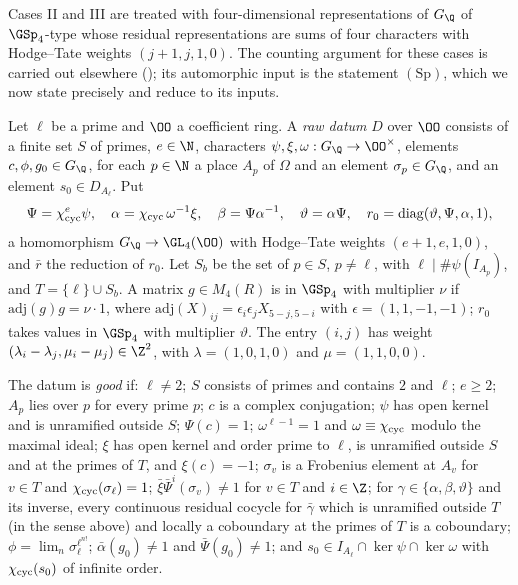 Cases II and III are treated with four-dimensional representations of $G_\Q$ of $\GSp_4$-type whose residual representations are
sums of four characters with Hodge--Tate weights $(j+1,j,1,0)$. The counting argument for these cases is carried out elsewhere
(); its automorphic input is the
statement $(\mathrm{Sp})$, which we now state precisely and reduce to its inputs.

\begin{definition}\label{pf:eis:raw}
Let $\ell$ be a prime and $\OO$ a coefficient ring. A \emph{raw datum} $D$ over $\OO$ consists of a finite set $S$ of primes, $e\in\N$,
characters $\psi,\xi,\omega:G_\Q\to\OO^\times$, elements $c,\phi,g_0\in G_\Q$, for each $p\in\N$ a place $A_p$ of $\Omega$ and an element
$\sigma_p\in G_\Q$, and an element $s_0\in D_{A_\ell}$. Put
\[
 \Psi=\chi_{\mathrm{cyc}}^e\psi,\quad\alpha=\chi_{\mathrm{cyc}}\,\omega^{-1}\xi,\quad\beta=\Psi\alpha^{-1},\quad\vartheta=\alpha\Psi,\quad
 r_0=\mathrm{diag}(\vartheta,\Psi,\alpha,1),
\]
a homomorphism $G_\Q\to\GL_4(\OO)$ with Hodge--Tate weights $(e+1,e,1,0)$, and $\bar r$ the reduction of $r_0$. Let $S_b$ be the set of $p\in S$, $p\ne\ell$, with
$\ell\mid\#\psi(I_{A_p})$, and $T=\{\ell\}\cup S_b$. A matrix $g\in M_4(R)$ is in $\GSp_4$ with multiplier $\nu$ if
$\mathrm{adj}(g)g=\nu\cdot1$, where $\mathrm{adj}(X)_{ij}=\epsilon_i\epsilon_jX_{5-j,5-i}$ with $\epsilon=(1,1,-1,-1)$; $r_0$ takes values in $\GSp_4$ with
multiplier $\vartheta$. The entry $(i,j)$ has weight $(\lambda_i-\lambda_j,\mu_i-\mu_j)\in\Z^2$, with $\lambda=(1,0,1,0)$ and $\mu=(1,1,0,0)$.

The datum is \emph{good} if: $\ell\ne2$; $S$ consists of primes and contains $2$ and $\ell$; $e\ge2$; $A_p$ lies over $p$ for every prime $p$; $c$ is a
complex conjugation; $\psi$ has open kernel and is unramified outside $S$; $\Psi(c)=1$; $\omega^{\ell-1}=1$ and $\omega\equiv\chi_{\mathrm{cyc}}$ modulo the
maximal ideal; $\xi$ has open kernel and order prime to $\ell$, is unramified outside $S$ and at the primes of $T$, and $\xi(c)=-1$; $\sigma_v$ is
a Frobenius element at $A_v$ for $v\in T$ and $\chi_{\mathrm{cyc}}(\sigma_\ell)=1$; $\bar\xi\bar\Psi^i(\sigma_v)\ne1$ for $v\in T$ and $i\in\Z$; for
$\gamma\in\{\alpha,\beta,\vartheta\}$ and its inverse, every continuous residual cocycle for $\bar\gamma$ which is unramified outside $T$ (in the
sense above) and locally a coboundary at the primes of $T$ is a coboundary; $\phi=\lim_n\sigma_\ell^{\ell^{n!}}$; $\bar\alpha(g_0)\ne1$ and
$\bar\Psi(g_0)\ne1$; and $s_0\in I_{A_\ell}\cap\ker\psi\cap\ker\omega$ with $\chi_{\mathrm{cyc}}(s_0)$ of infinite order.
\end{definition}

